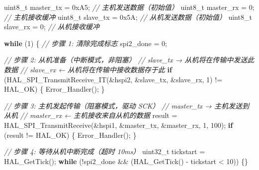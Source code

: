 \documentclass[
  chinese,
  UTF8,
  oneside,
  openany]{ctexbook}
\newenvironment{Shaded}{}{}
\newcommand{\BaseNTok}[1]{\textcolor[rgb]{0.25,0.63,0.44}{#1}}
\newcommand{\CommentTok}[1]{\textcolor[rgb]{0.38,0.63,0.69}{\textit{#1}}}
\newcommand{\ControlFlowTok}[1]{\textcolor[rgb]{0.00,0.44,0.13}{\textbf{#1}}}
\newcommand{\DataTypeTok}[1]{\textcolor[rgb]{0.56,0.13,0.00}{#1}}
\newcommand{\DecValTok}[1]{\textcolor[rgb]{0.25,0.63,0.44}{#1}}
\newcommand{\NormalTok}[1]{#1}
\newcommand{\OperatorTok}[1]{\textcolor[rgb]{0.40,0.40,0.40}{#1}}
\begin{document}
\begin{Shaded}
\begin{Highlighting}[]
\DataTypeTok{uint8\_t}\NormalTok{ master\_tx }\OperatorTok{=} \BaseNTok{0xA5}\OperatorTok{;}   \CommentTok{// 主机发送数据（初始值）}
\DataTypeTok{uint8\_t}\NormalTok{ master\_rx }\OperatorTok{=} \DecValTok{0}\OperatorTok{;}      \CommentTok{// 主机接收缓冲}
\DataTypeTok{uint8\_t}\NormalTok{ slave\_tx  }\OperatorTok{=} \BaseNTok{0x5A}\OperatorTok{;}   \CommentTok{// 从机发送数据（初始值）}
\DataTypeTok{uint8\_t}\NormalTok{ slave\_rx  }\OperatorTok{=} \DecValTok{0}\OperatorTok{;}      \CommentTok{// 从机接收缓冲}

\ControlFlowTok{while} \OperatorTok{(}\DecValTok{1}\OperatorTok{)}
\OperatorTok{\{}
    \CommentTok{// 步骤 1: 清除完成标志}
\NormalTok{    spi2\_done }\OperatorTok{=} \DecValTok{0}\OperatorTok{;}

    \CommentTok{// 步骤 2: 从机准备（中断模式，非阻塞）}
    \CommentTok{//         slave\_tx → 从机将在传输中发送此数据}
    \CommentTok{//         slave\_rx ← 从机将在传输中接收数据存于此}
    \ControlFlowTok{if} \OperatorTok{(}\NormalTok{HAL\_SPI\_TransmitReceive\_IT}\OperatorTok{(\&}\NormalTok{hspi2}\OperatorTok{,} \OperatorTok{\&}\NormalTok{slave\_tx}\OperatorTok{,} \OperatorTok{\&}\NormalTok{slave\_rx}\OperatorTok{,} \DecValTok{1}\OperatorTok{)} \OperatorTok{!=}\NormalTok{ HAL\_OK}\OperatorTok{)} \OperatorTok{\{}
\NormalTok{        Error\_Handler}\OperatorTok{();}
    \OperatorTok{\}}

    \CommentTok{// 步骤 3: 主机发起传输（阻塞模式，驱动 SCK）}
    \CommentTok{//         master\_tx → 主机发送到从机}
    \CommentTok{//         master\_rx ← 主机接收来自从机的数据}
\NormalTok{    result }\OperatorTok{=}\NormalTok{ HAL\_SPI\_TransmitReceive}\OperatorTok{(\&}\NormalTok{hspi1}\OperatorTok{,} \OperatorTok{\&}\NormalTok{master\_tx}\OperatorTok{,} \OperatorTok{\&}\NormalTok{master\_rx}\OperatorTok{,} \DecValTok{1}\OperatorTok{,} \DecValTok{100}\OperatorTok{);}
    \ControlFlowTok{if} \OperatorTok{(}\NormalTok{result }\OperatorTok{!=}\NormalTok{ HAL\_OK}\OperatorTok{)} \OperatorTok{\{}
\NormalTok{        Error\_Handler}\OperatorTok{();}
    \OperatorTok{\}}

    \CommentTok{// 步骤 4: 等待从机中断完成（超时 10ms）}
    \DataTypeTok{uint32\_t}\NormalTok{ tickstart }\OperatorTok{=}\NormalTok{ HAL\_GetTick}\OperatorTok{();}
    \ControlFlowTok{while} \OperatorTok{(!}\NormalTok{spi2\_done }\OperatorTok{\&\&} \OperatorTok{(}\NormalTok{HAL\_GetTick}\OperatorTok{()} \OperatorTok{{-}}\NormalTok{ tickstart }\OperatorTok{\textless{}} \DecValTok{10}\OperatorTok{))} \OperatorTok{\{\}}


\end{Highlighting}
\end{Shaded}
\end{document}
